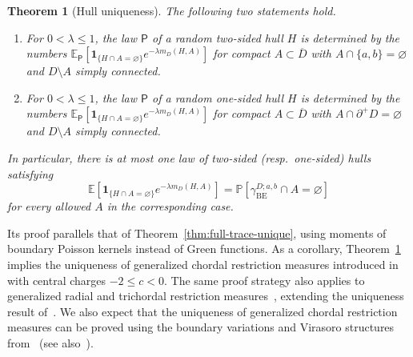\documentclass[11pt]{article}
\numberwithin{equation}{section}
\newcommand{\E}{\mathbb{E}}
\newcommand{\1}{\mathbf{1}}
\newcommand{\BE}{\mathrm{BE}}
\newtheorem{theorem}{Theorem}[section]
\newcommand{\one}{\mathbf 1}
\newcommand{\Prob}{\mathbb P}
\begin{document}
\begin{theorem}[Hull uniqueness]\label{thm:hull-unique}
The following two statements hold.
\begin{enumerate}[label=\textup{(\roman*)},leftmargin=2.3em]
\item\label{item:two-sided-unique}
For \(0<\lambda\leq1\), the law $\mathsf P$ of a random two-sided hull $H$ is
determined by the numbers $\E_{\mathsf P}\left[\one_{\{H\cap A=\varnothing\}}
 e^{-\lambda m_D(H,A)}\right]$ for compact
\(A\subset\overline D\) with
\(A\cap\{a,b\}=\varnothing\) and \(D\setminus A\) simply connected.
\item\label{item:one-sided-unique}
For \(0<\lambda\leq1\), the law $\mathsf P$ of a random one-sided hull $H$ is
determined by the numbers $\E_{\mathsf P}\left[\one_{\{H\cap A=\varnothing\}}
 e^{-\lambda m_D(H,A)}\right]$ for compact
\(A\subset\overline D\) with
\(A\cap\partial^+D=\varnothing\) and \(D\setminus A\) simply connected.
\end{enumerate}
In particular, there is at most one law of two-sided (resp.~one-sided) hulls satisfying
\begin{equation}\label{eq:hull-id}
 \E\!\left[\one_{\{H\cap A=\varnothing\}}
 e^{-\lambda m_D(H,A)}\right]=\Prob\left[\gamma_{\BE}^{D;a,b}\cap A=\varnothing\right]
\end{equation}
for every allowed \(A\) in the corresponding case.
\end{theorem}

Its proof parallels that of Theorem~\ref{thm:full-trace-unique}, using moments of boundary Poisson kernels instead of Green functions.
As a corollary, Theorem~\ref{thm:hull-unique} implies the uniqueness of generalized chordal restriction measures introduced in~\cite{qian2021generalized} with central charges $-2\le c<0$. The same proof strategy also applies to generalized radial and trichordal restriction measures~\cite{qian-trichordal,qian2021generalized}, extending the uniqueness result of~\cite{CG25}. We also expect that the uniqueness of generalized chordal restriction measures can be proved using the boundary variations and Virasoro structures from~\cite{BJ2024} (see also~\cite{gordina2024infinitesimal}).
\end{document}
